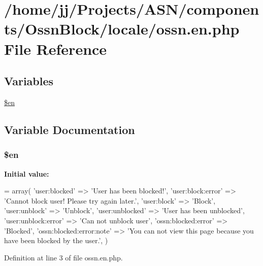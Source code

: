 \hypertarget{components_2_ossn_block_2locale_2ossn_8en_8php}{}\section{/home/jj/\+Projects/\+A\+S\+N/components/\+Ossn\+Block/locale/ossn.en.\+php File Reference}
\label{components_2_ossn_block_2locale_2ossn_8en_8php}
\subsection*{Variables}
\begin{DoxyCompactItemize}
\item 
\hyperlink{components_2_ossn_block_2locale_2ossn_8en_8php_a48abc714dfb71c8fffa83cf49f452115}{\$en}
\end{DoxyCompactItemize}


\subsection{Variable Documentation}
\subsubsection[{\texorpdfstring{\$en}{$en}}]{\setlength{\rightskip}{0pt plus 5cm}\$en}\hypertarget{components_2_ossn_block_2locale_2ossn_8en_8php_a48abc714dfb71c8fffa83cf49f452115}{}\label{components_2_ossn_block_2locale_2ossn_8en_8php_a48abc714dfb71c8fffa83cf49f452115}
{\bfseries Initial value\+:}
\begin{DoxyCode}
= array(
    \textcolor{stringliteral}{'user:blocked'} => \textcolor{stringliteral}{'User has been blocked!'},
    \textcolor{stringliteral}{'user:block:error'} => \textcolor{stringliteral}{'Cannot block user! Please try again later.'},
    \textcolor{stringliteral}{'user:block'} => \textcolor{stringliteral}{'Block'},
    \textcolor{stringliteral}{'user:unblock'} => \textcolor{stringliteral}{'Unblock'},
    \textcolor{stringliteral}{'user:unblocked'} => \textcolor{stringliteral}{'User has been unblocked'},
    \textcolor{stringliteral}{'user:unblock:error'} => \textcolor{stringliteral}{'Can not unblock user'},
    \textcolor{stringliteral}{'ossn:blocked:error'} => \textcolor{stringliteral}{'Blocked'},
    \textcolor{stringliteral}{'ossn:blocked:error:note'} => \textcolor{stringliteral}{'You can not view this page because you have been blocked by the user.'},
)
\end{DoxyCode}


Definition at line 3 of file ossn.\+en.\+php.

